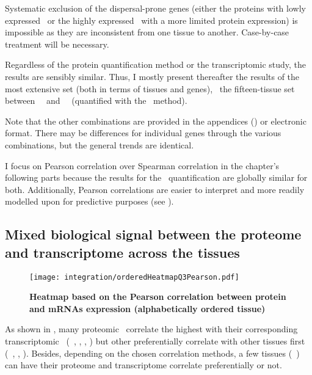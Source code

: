 Systematic exclusion of the dispersal-prone genes
(either the proteins with lowly expressed \mRNAs\
or the highly expressed \mRNAs\ with a more limited protein expression)
is impossible
as they are inconsistent from one tissue to another.\label{memo:dispersedGenes}
Case-by-case treatment will be necessary.

Regardless of the protein quantification method or
the transcriptomic study, %
the results are sensibly similar.
Thus, I mostly present thereafter the results of the most extensive set
(both in terms of tissues and genes),
\ie\ the fifteen-tissue set between \uhlen\ \etal\ and \pandey\ \etal\
(quantified with the \PPKM\ method).\mybr\

Note that the other combinations are provided
in the appendices ()
or electronic format.
There may be differences for individual genes through the various combinations,
but the general trends are identical.

I focus on Pearson correlation over Spearman correlation\label{seg:pearOverSpear}
in the chapter's following parts
because the results for the \PPKM\ quantification are globally similar for both.
Additionally, Pearson correlations are easier to interpret
and more readily modelled upon for predictive purposes
(see \Cref{subsec:PearsonVsSpearman}).\mybr\

\subsection{Mixed biological signal between the proteome and transcriptome
across the tissues}

\begin{figure}[!hbt]
    \texttt{[image: integration/orderedHeatmapQ3Pearson.pdf]}\centering
    \vspace{-3mm}
    \caption[Heatmap based on the Pearson correlation between protein and mRNAs
    expression (alphabetically ordered tissue)]{\label{fig:orderedHeatmapPearson}%
    \textbf{Heatmap based on the Pearson correlation between protein and mRNAs
    expression (alphabetically ordered tissue)}}
\end{figure}

As shown in ,
many proteomic \treps\ correlate the highest with
their corresponding transcriptomic \trep\
(\eg\ \liver, \testis, \ovary, \pancreas)
but other preferentially correlate with other tissues first
(\eg\ \bladder, \Oesophagus, \gallbladder).
Besides, depending on the chosen correlation methods,
a few tissues (\eg\ \heart) can have
their proteome and transcriptome correlate preferentially or not.\\
\vspace{-\baselineskip}

